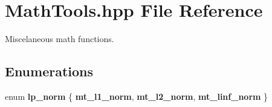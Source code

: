 \section{Math\+Tools.\+hpp File Reference}
\label{MathTools_8hpp}


Miscelaneous math functions.  


\subsection*{Enumerations}
\begin{DoxyCompactItemize}
\item 
enum {\bfseries lp\+\_\+norm} \{ {\bfseries mt\+\_\+l1\+\_\+norm}, 
{\bfseries mt\+\_\+l2\+\_\+norm}, 
{\bfseries mt\+\_\+linf\+\_\+norm}
 \}\label{MathTools_8hpp_a662cda9bc4cad493eddc78a0a82b2927}

\end{DoxyCompactItemize}
